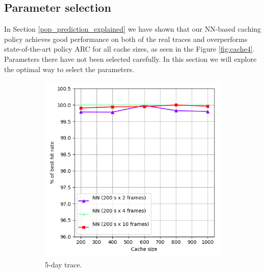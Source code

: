 \subsection{Parameter selection} \label{parameter_selection}

In Section \ref{pop_prediction_explained} we have shown that our NN-based caching policy achieves good performance on both of the real traces and overperforms state-of-the-art policy ARC for all cache sizes, as seen in the Figure \ref{fig:cache4}. Parameters there have not been selected carefully. In this section we will explore the optimal way to select the parameters.

\begin{figure}[t!]
	\centering
	\captionsetup{justification=centering}
	\begin{subfigure}[b]{0.49\linewidth}
		\includegraphics[width=\linewidth]{pics/cache5.png}
		\caption{5-day trace.}
	\end{subfigure}
	\begin{subfigure}[b]{0.49\linewidth}

\end{subfigure}
\end{figure}
